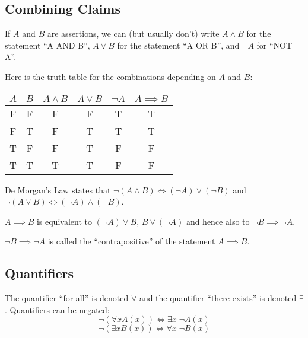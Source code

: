 \documentclass[../main.tex]{subfiles}
\begin{document}
\subsection{Combining Claims}
If $A$ and $B$ are assertions, we can (but usually don't) write $A \land B$ for the statement ``A AND B'', $A \lor B$ for the statement ``A OR B'', and $\lnot A$ for ``NOT A''.

Here is the truth table for the combinations depending on $A$ and $B$:\par
\begin{center}
\begin{tabular}{c|c|c|c|c|c}
  $A$ & $B$ & $A \land B$ & $A \lor B$ & $\lnot A$ & $A \implies B$ \\
\hline
  F & F & F & F & T & T \\
  F & T & F & T & T & T \\
  T & F & F & T & F & F \\
  T & T & T & T & F & F 
\end{tabular}
\end{center}\par
De Morgan's Law states that $\lnot (A \land B) \iff (\lnot A) \lor (\lnot B)$ and $\lnot (A \lor B) \iff (\lnot A) \land (\lnot B)$.

$A \implies B$ is equivalent to $(\lnot A) \lor B$, $B \lor (\lnot A)$ and hence also to $\lnot B \implies \lnot A$.

$\lnot B \implies \lnot A$ is called the ``contrapositive'' of the statement $A \implies B$.

\subsection{Quantifiers}
The quantifier ``for all'' is denoted $\forall$ and the quantifier ``there exists'' is denoted $\exists$.
Quantifiers can be negated:
\[
  \lnot (\forall x A(x)) \iff \exists x\; \lnot A(x) 
\]
\[
  \lnot (\exists x B(x)) \iff \forall x\; \lnot B(x) 
\]
\end{document}
